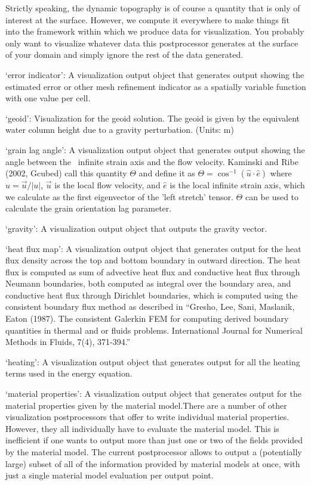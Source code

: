\begin{itemize}
Strictly speaking, the dynamic topography is of course a quantity that is only of interest at the surface. However, we compute it everywhere to make things fit into the framework within which we produce data for visualization. You probably only want to visualize whatever data this postprocessor generates at the surface of your domain and simply ignore the rest of the data generated.

`error indicator': A visualization output object that generates output showing the estimated error or other mesh refinement indicator as a spatially variable function with one value per cell.

`geoid': Visualization for the geoid solution. The geoid is given by the equivalent water column height due to a gravity perturbation. (Units: m)

`grain lag angle': A visualization output object that generates output showing the angle between the ~infinite strain axis and the flow velocity. Kaminski and Ribe (2002, Gcubed) call this quantity $\Theta$ and define it as $\Theta = \cos^{-1}(\hat{u}\cdot\hat{e})$  where $\hat{u}=\vec{u}/|{u}|$, $\vec{u}$ is the local flow velocity, and $\hat{e}$ is the local infinite strain axis, which we calculate as the first eigenvector of the 'left stretch' tensor. $\Theta$ can be used to calculate the grain orientation lag parameter.

`gravity': A visualization output object that outputs the gravity vector.

`heat flux map': A visualization output object that generates output for the heat flux density across the top and bottom boundary in outward direction. The heat flux is computed as sum of advective heat flux and conductive heat flux through Neumann boundaries, both computed as integral over the boundary area, and conductive heat flux through Dirichlet boundaries, which is computed using the consistent boundary flux method as described in ``Gresho, Lee, Sani, Maslanik, Eaton (1987). The consistent Galerkin FEM for computing derived boundary quantities in thermal and or fluids problems. International Journal for Numerical Methods in Fluids, 7(4), 371-394.''

`heating': A visualization output object that generates output for all the heating terms used in the energy equation.

`material properties': A visualization output object that generates output for the material properties given by the material model.There are a number of other visualization postprocessors that offer to write individual material properties. However, they all individually have to evaluate the material model. This is inefficient if one wants to output more than just one or two of the fields provided by the material model. The current postprocessor allows to output a (potentially large) subset of all of the information provided by material models at once, with just a single material model evaluation per output point.


\end{itemize}
